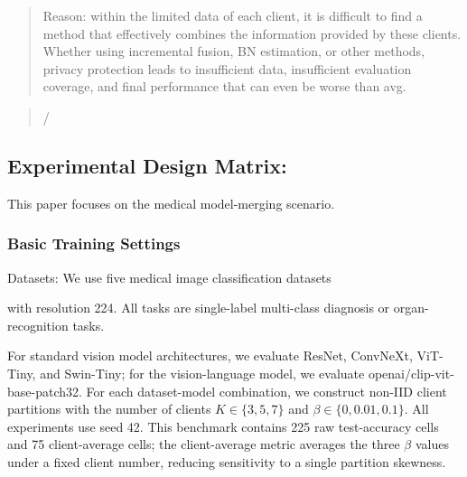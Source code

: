 \documentclass[letterpaper]{article}
\begin{document}
\begin{quote}\small Reason: within the limited data of each client, it is difficult to find a method that effectively combines the information provided by these clients. Whether using incremental fusion, BN estimation, or other methods, privacy protection leads to insufficient data, insufficient evaluation coverage, and final performance that can even be worse than avg.\end{quote}

\begin{quote}\small */\end{quote}

\subsection{Experimental Design Matrix:}

This paper focuses on the medical model-merging scenario.


\subsubsection{Basic Training Settings}

Datasets: We use five medical image classification datasets


with resolution 224. All tasks are single-label multi-class diagnosis or organ-recognition tasks.


For standard vision model architectures, we evaluate ResNet, ConvNeXt, ViT-Tiny, and Swin-Tiny; for the vision-language model, we evaluate openai/clip-vit-base-patch32. For each dataset-model combination, we construct non-IID client partitions with the number of clients $K\in\{3,5,7\}$ and $\beta\in\{0,0.01,0.1\}$. All experiments use seed 42. This benchmark contains 225 raw test-accuracy cells and 75 client-average cells; the client-average metric averages the three $\beta$ values under a fixed client number, reducing sensitivity to a single partition skewness.
\end{document}
